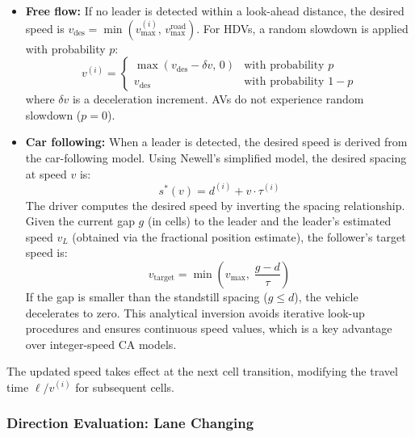 \documentclass[review,authoryear]{elsarticle}
\begin{document}
\begin{itemize}
    \item \textbf{Free flow:} If no leader is detected within a look-ahead distance, the desired speed is $v_{\text{des}} = \min(v_{\max}^{(i)},\, v_{\max}^{\text{road}})$. For HDVs, a random slowdown is applied with probability $p$:
    \begin{equation}
        v^{(i)} = \begin{cases}
            \max(v_{\text{des}} - \delta v,\, 0) & \text{with probability } p \\
            v_{\text{des}} & \text{with probability } 1 - p
        \end{cases}
        \label{eq:free_flow}
    \end{equation}
    where $\delta v$ is a deceleration increment. AVs do not experience random slowdown ($p = 0$).

    \item \textbf{Car following:} When a leader is detected, the desired speed is derived from the car-following model. Using Newell's simplified model, the desired spacing at speed $v$ is:
    \begin{equation}
        s^{*}(v) = d^{(i)} + v \cdot \tau^{(i)}
        \label{eq:desired_spacing}
    \end{equation}
    The driver computes the desired speed by inverting the spacing relationship. Given the current gap $g$ (in cells) to the leader and the leader's estimated speed $v_L$ (obtained via the fractional position estimate), the follower's target speed is:
    \begin{equation}
        v_{\text{target}} = \min\!\left(v_{\max},\; \frac{g - d}{\tau}\right)
        \label{eq:speed_target}
    \end{equation}
    If the gap is smaller than the standstill spacing ($g \leq d$), the vehicle decelerates to zero. This analytical inversion avoids iterative look-up procedures and ensures continuous speed values, which is a key advantage over integer-speed CA models.
\end{itemize}

The updated speed takes effect at the next cell transition, modifying the travel time $\ell / v^{(i)}$ for subsequent cells.

\subsubsection{Direction Evaluation: Lane Changing}
\label{sec:lane_changing}
\end{document}
